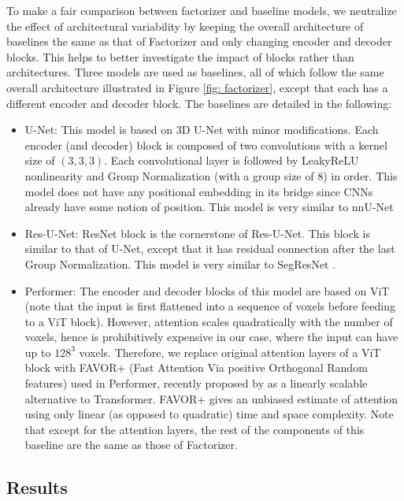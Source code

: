 \documentclass[a4,12pt]{article}
\begin{document}
	To make a fair comparison between factorizer and baseline models, we neutralize the effect of architectural variability by keeping the overall architecture of baselines the same as that of Factorizer and only changing encoder and decoder blocks. This helps to better investigate the impact of blocks rather than architectures. Three models are used as baselines, all of which follow the same overall architecture illustrated in Figure \ref{fig: factorizer}, except that each has a different encoder and decoder block. The baselines are detailed in the following: 
	\begin{itemize}
		\item U-Net: This model is based on 3D U-Net \citep{cciccek20163d} with minor modifications. Each encoder (and decoder) block is composed of two convolutions with a kernel size of $ (3, 3, 3) $. Each convolutional layer is followed by LeakyReLU nonlinearity and Group Normalization (with a group size of 8) in order. This model does not have any positional embedding in its bridge since CNNs already have some notion of position. This model is very similar to nnU-Net \citep{isensee2018no}
		
		\item Res-U-Net: ResNet block \citep{he2016deep} is the cornerstone of Res-U-Net. This block is similar to that of U-Net, except that it has residual connection after the last Group Normalization. This model is very similar to SegResNet \citep{myronenko20183d}.
		
		\item Performer: The encoder and decoder blocks of this model are based on ViT (note that the input is first flattened into a sequence of voxels before feeding to a ViT block). However, attention scales quadratically with the number of voxels, hence is prohibitively expensive in our case, where the input can have up to $ 128^3 $ voxels. Therefore, we replace original attention layers of a ViT block with FAVOR+ (Fast Attention Via positive Orthogonal Random features) used in Performer, recently proposed by \citet{choromanski2020rethinking} as a linearly scalable alternative to Transformer. FAVOR+ gives an unbiased estimate of attention using only linear (as opposed to quadratic) time and space complexity. Note that except for the attention layers, the rest of the components of this baseline are the same as those of Factorizer.
		
		
	\end{itemize}
	
	
	\subsection{Results}
	
\end{document}
